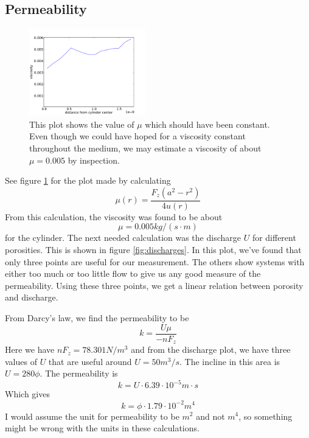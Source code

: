 \documentclass[reprint,floatfix,amsmath,amssymb,aps,pra]{revtex4-1}
\begin{document}
\subsection{Permeability}
%
\begin{figure}
  \centering
  \includegraphics[width=0.45\textwidth]{../analysis/1j-cylinder-force/runs/2013-04-05_201107/viscosity.pdf}
  \caption{This plot shows the value of $\mu$ which should have been constant. Even though we could have hoped for a viscosity constant throughout the medium, we may estimate a viscosity of about $\mu = 0.005$ by inspection.}
  \label{fig:viscosity-plot}
\end{figure}
%
%
See figure \ref{fig:viscosity-plot} for the plot made by calculating
\begin{equation}
  \mu(r) = \frac{F_{z}(a^2 - r^2)}{4 u(r)}
\end{equation}
%
From this calculation, the viscosity was found to be about
%
\begin{equation}
  \mu = 0.005 \unit{kg/(s\cdot m)}
\end{equation} 
%
for the cylinder.
%
The next needed calculation was the discharge $U$ for different porosities. This is shown in figure \ref{fig:discharges}. In this plot, we've found that only three points are useful for our measurement. The others show systems with either too much or too little flow to give us any good measure of the permeability. Using these three points, we get a linear relation between porosity and discharge.

From Darcy's law, we find the permeability to be
\begin{equation}
  k = \frac{U\mu}{-nF_z}
\end{equation} 
Here we have $nF_z = 78.301 \unit{N/m^{3}}$ and from the discharge plot, we have three values of $U$ that are useful around $U = 50 \unit{m^{3}/ s}$. The incline in this area is $U = 280 \phi$. The permeability is
\begin{equation}
  k = U \cdot 6.39 \cdot 10^{-5} \unit{m \cdot s}
\end{equation} 
Which gives
\begin{equation}
  k =  \phi\cdot 1.79 \cdot 10^{-2} \unit{m^4}
\end{equation} 
I would assume the unit for permeability to be $\unit{m^{2}}$ and not $\unit{m^{4}}$, so something might be wrong with the units in these calculations.
\end{document}
